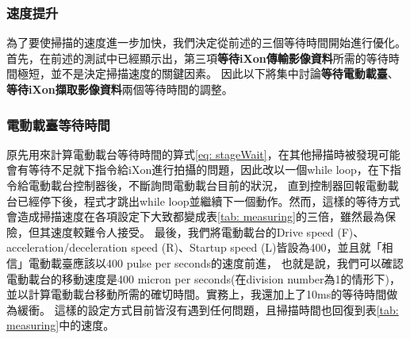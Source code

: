 \documentclass[12pt]{article}
\begin{document}
\subsubsection{速度提升}
為了要使掃描的速度進一步加快，我們決定從前述的三個等待時間開始進行優化。首先，在前述的測試中已經顯示出，第三項\textbf{等待iXon傳輸影像資料}所需的等待時間極短，並不是決定掃描速度的關鍵因素。
因此以下將集中討論\textbf{等待電動載臺}、\textbf{等待iXon擷取影像資料}兩個等待時間的調整。
\subsubsection{電動載臺等待時間}
原先用來計算電動載台等待時間的算式\ref{eq: stageWait}，在其他掃描時被發現可能會有等待不足就下指令給iXon進行拍攝的問題，因此改以一個while loop，在下指令給電動載台控制器後，不斷詢問電動載台目前的狀況，
直到控制器回報電動載台已經停下後，程式才跳出while loop並繼續下一個動作。然而，這樣的等待方式會造成掃描速度在各項設定下大致都變成表\ref{tab: measuring}的三倍，雖然最為保險，但其速度較難令人接受。
最後，我們將電動載台的Drive speed (F)、acceleration/deceleration speed (R)、Startup speed (L)皆設為400，並且就「相信」電動載臺應該以400 pulse per seconds的速度前進，
也就是說，我們可以確認電動載台的移動速度是400 micron per seconds(在division number為1的情形下)，並以計算電動載台移動所需的確切時間。實務上，我還加上了10ms的等待時間做為緩衝。
這樣的設定方式目前皆沒有遇到任何問題，且掃描時間也回復到表\ref{tab: measuring}中的速度。
\end{document}
